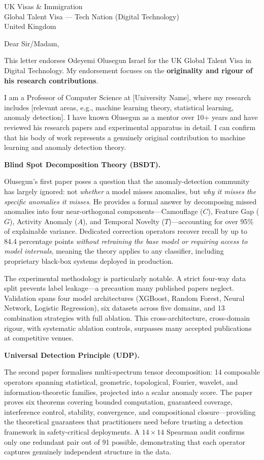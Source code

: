 \documentclass[12pt,a4paper]{letter}
\date{27 February 2026}
\begin{document}
\begin{letter}{UK Visas \& Immigration\\
Global Talent Visa --- Tech Nation (Digital Technology)\\
United Kingdom}

\opening{Dear Sir/Madam,}

This letter endorses Odeyemi Olusegun Israel for the UK Global Talent Visa in Digital Technology. My endorsement focuses on the \textbf{originality and rigour of his research contributions}.

I am a Professor of Computer Science at {[University Name]}, where my research includes {[relevant areas, e.g., machine learning theory, statistical learning, anomaly detection]}. I have known Olusegun as a mentor over 10+ years and have reviewed his research papers and experimental apparatus in detail. I can confirm that his body of work represents a genuinely original contribution to machine learning and anomaly detection theory.

\textbf{Blind Spot Decomposition Theory (BSDT).}

Olusegun's first paper poses a question that the anomaly-detection community has largely ignored: not \textit{whether} a model misses anomalies, but \textit{why it misses the specific anomalies it misses}. He provides a formal answer by decomposing missed anomalies into four near-orthogonal components---Camouflage ($C$), Feature Gap ($G$), Activity Anomaly ($A$), and Temporal Novelty ($T$)---accounting for over 95\% of explainable variance. Dedicated correction operators recover recall by up to 84.4 percentage points \textit{without retraining the base model or requiring access to model internals}, meaning the theory applies to any classifier, including proprietary black-box systems deployed in production.

The experimental methodology is particularly notable. A strict four-way data split prevents label leakage---a precaution many published papers neglect. Validation spans four model architectures (XGBoost, Random Forest, Neural Network, Logistic Regression), six datasets across five domains, and 13 combination strategies with full ablation. This cross-architecture, cross-domain rigour, with systematic ablation controls, surpasses many accepted publications at competitive venues.

\textbf{Universal Detection Principle (UDP).}

The second paper formalises multi-spectrum tensor decomposition: 14 composable operators spanning statistical, geometric, topological, Fourier, wavelet, and information-theoretic families, projected into a scalar anomaly score. The paper proves six theorems covering bounded computation, guaranteed coverage, interference control, stability, convergence, and compositional closure---providing the theoretical guarantees that practitioners need before trusting a detection framework in safety-critical deployments. A $14\times14$ Spearman audit confirms only one redundant pair out of 91 possible, demonstrating that each operator captures genuinely independent structure in the data.


\end{letter}
\end{document}
